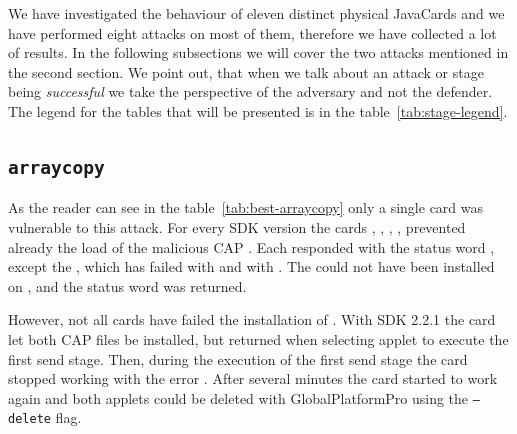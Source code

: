 \documentclass{../llncs/llncs}
\begin{document}
        We have investigated the behaviour of eleven distinct physical JavaCards and we have performed eight attacks on most of them, therefore we have collected a lot of results. In the following subsections we will cover the two attacks mentioned in the second section. We point out, that when we talk about an attack or stage being \textit{successful} we take the perspective of the adversary and not the defender. The legend for the tables that will be presented is in the table~\ref{tab:stage-legend}.

\setlength{\tabcolsep}{.5pt}
\renewcommand{\arraystretch}{.20}
\setlength{\floatsep}{0pt}

\begin{table}[htb!]
    \captionsetup{font=footnotesize}
    \parbox[b][][b]{.45\linewidth}{
        
    }
    \hfill
    \parbox[b][][b]{.45\linewidth}{
        
    }
\end{table}

\subsection{\texttt{arraycopy}}\label{subsec:result-arraycopy}
            As the reader can see in the table~\ref{tab:best-arraycopy} only a single card was vulnerable to this attack. For every SDK version the cards \Cnewcard, \Fcard, \Gcard, \Hcard, \Inewcard prevented already the load of the malicious CAP \vulnscap. Each responded with the status word \swwrongdata, except the \Cnewcard, which has failed with \swunknown and \Inewcard with \swwrongdata. The \vulnscap could not have been installed on \Icard, \Ccard and the status word \swconditionsnotsatisfied was returned.

            However, not all cards have failed the installation of \vulnscap. With SDK 2.2.1 the card \Dcard let both CAP files be installed, but returned \swclanotsupported when selecting applet to execute the first send stage. Then, during the execution of the first send stage the card stopped working with the error \scardenottransacted. After several minutes the card started to work again and both applets could be deleted with GlobalPlatformPro using the \texttt{--delete} flag.
\end{document}
